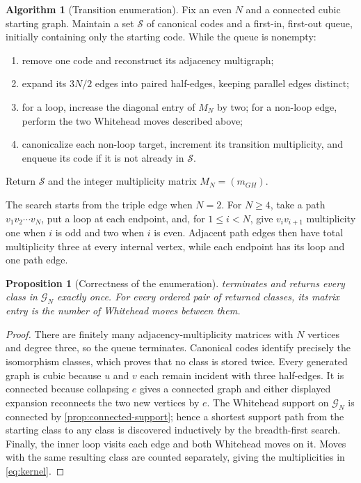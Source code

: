 \documentclass[11pt]{article}
\newcommand{\C}{\mathcal G}
\theoremstyle{plain}
\newtheorem{proposition}[proposition]{Proposition}
\theoremstyle{definition}
\newtheorem{algorithm}[algorithm]{Algorithm}
\numberwithin{equation}{section}
\begin{document}
\begin{algorithm}[Transition enumeration]\label{alg:enumeration}
Fix an even $N$ and a connected cubic starting graph.  Maintain a set
$\mathcal S$ of canonical codes and a first-in, first-out queue, initially
containing only the starting code.  While the queue is nonempty:

\begin{enumerate}
\item remove one code and reconstruct its adjacency multigraph;
\item expand its $3N/2$ edges into paired half-edges, keeping parallel
edges distinct;
\item for a loop, increase the diagonal entry of $M_N$ by two; for a non-loop
edge, perform the two Whitehead moves described above;
\item canonicalize each non-loop target, increment its transition
multiplicity, and enqueue its code if it is not already in $\mathcal S$.
\end{enumerate}

Return $\mathcal S$ and the integer multiplicity matrix
$M_N=(m_{GH})$.
\end{algorithm}

The search starts from the triple edge when $N=2$.  For $N\geq4$, take a path
$v_1v_2\cdots v_N$, put a loop at each endpoint, and, for $1\leq i<N$, give
$v_iv_{i+1}$ multiplicity one when $i$ is odd and two when $i$ is even.
Adjacent path edges then have total multiplicity three at every internal
vertex, while each endpoint has its loop and one path edge.

\begin{proposition}[Correctness of the enumeration]
 terminates and returns every class in $\C_N$ exactly
once.  For every ordered pair of returned classes, its matrix entry is the
number of Whitehead moves between them.
\end{proposition}

\begin{proof}
There are finitely many adjacency-multiplicity matrices with $N$ vertices and
degree three, so the queue terminates.  Canonical codes identify precisely
the isomorphism classes, which proves that no class is stored twice.  Every
generated graph is cubic because $u$ and $v$ each remain incident with three
half-edges.  It is connected because collapsing $e$ gives a connected graph and
either displayed expansion reconnects the two new vertices by $e$.  The
Whitehead support on $\C_N$ is connected by
\cref{prop:connected-support}; hence a shortest support path from the starting
class to any class is discovered inductively by the breadth-first search.
Finally, the inner loop visits each edge and both Whitehead moves on it.
Moves with the same resulting class are counted separately, giving the
multiplicities in \eqref{eq:kernel}.
\end{proof}
\end{document}
